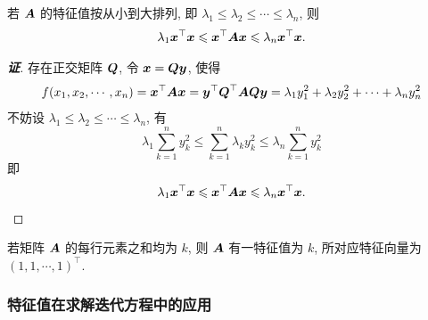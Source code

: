 \begin{theorem}[特征值不等式]
    \label{tzzbds}若 $\vb*{A}$ 的特征值按从小到大排列, 即 $\lambda_1\leqslant \lambda_2\leqslant \cdots\leqslant \lambda_n$, 则 $$\lambda_1\vb*{x}^\top\vb*{x}\leqslant \vb*{x}^\top\vb*{Ax}\leqslant \lambda_n\vb*{x}^\top\vb*{x}.$$
\end{theorem}
\begin{proof}[{\songti \textbf{证}}]
    存在正交矩阵 $\vb*{Q}$, 令 $\vb*{x}=\vb*{Qy}$, 使得 $$f(x_1,x_2,\cdots,x_n)=\vb*{x}^\top\vb*{Ax}=\vb*{y}^\top\vb*{Q}^\top\vb*{AQy}=\lambda_1y_1^2+\lambda_2y_2^2+\cdots+\lambda_ny_n^2$$
    不妨设 $\lambda_1\leqslant \lambda_2\leqslant\cdots\leqslant\lambda_n$, 有 
    $$\lambda_1\sum_{k=1}^{n}y_k^2\leqslant \sum_{k=1}^{n}\lambda_ky_k^2\leqslant \lambda_n\sum_{k=1}^{n}y_k^2$$
    即 $$\lambda_1\vb*{x}^\top\vb*{x}\leqslant \vb*{x}^\top\vb*{Ax}\leqslant \lambda_n\vb*{x}^\top\vb*{x}.$$
\end{proof}

\begin{theorem}[行均和定理]
    \label{hangjunhedl}若矩阵 $\vb*{A}$ 的每行元素之和均为 $k$, 则 $\vb*{A}$ 有一特征值为 $k$, 所对应特征向量为 $(1,1,\cdots,1)^\top.$
\end{theorem}

\subsubsection{特征值在求解迭代方程中的应用}

